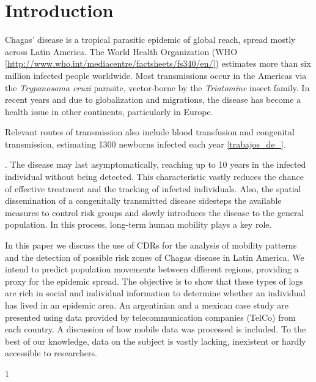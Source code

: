 \section{Introduction}

Chagas' disease is a tropical parasitic epidemic of global reach, spread mostly across Latin America. The World Health Organization (WHO \ref{http://www.who.int/mediacentre/factsheets/fs340/en/}) estimates more than six million infected people worldwide. Most transmissions occur in the Americas via the \textit{Trypanosoma cruzi} parasite, vector-borne by the \textit{Triatomine} insect family. In recent years and due to globalization and migrations, the disease has become a health issue in other continents, particularly in Europe. 

Relevant routes of transmission also include blood transfusion and congenital transmission, estimating 1300 newborns infected each year \ref{trabajos_de_}.\begin{comment}  en el drive estan las ppt del min salud \end{comment}. The disease may last asymptomatically, reaching up to 10 years in the infected individual without being detected. This characteristic vastly reduces the chance of effective treatment and the tracking of infected individuals. Also, the spatial dissemination of a congenitally transmitted disease sidesteps the available measures to control risk groups and slowly introduces the disease to the general population. In this process, long-term human mobility plays a key role.

In this paper we discuss the use of CDRs for the analysis of mobility patterns and the detection of possible risk zones of Chagas disease in Latin America. We intend to predict population movements between different regions, providing a proxy for the epidemic spread. The objective is to show that these types of logs are rich in social and individual information to determine whether an individual has lived in an epidemic area. An argentinian and a mexican case study are presented using data provided by telecommunication companies (TelCo) from each country. A discussion of how mobile data was processed is included. To the best of our knowledge, data on the subject is vastly lacking, inexistent or hardly accessible to researchers. 


1